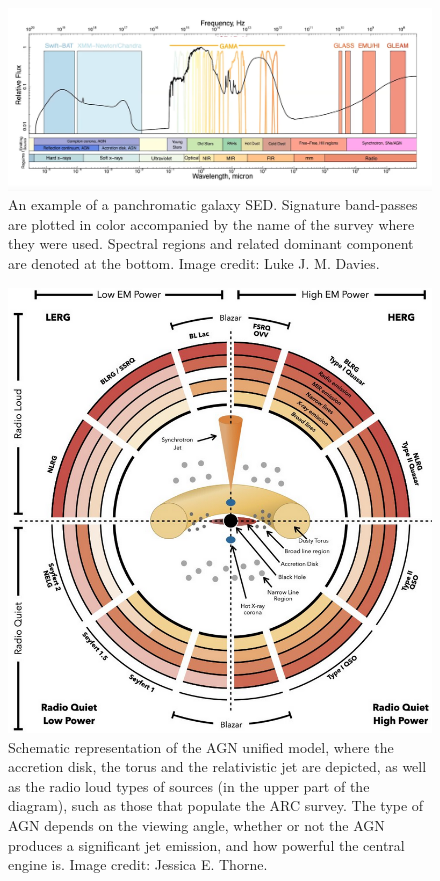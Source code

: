 \begin{figure}
  \includegraphics[width =\textwidth]{figures/SEDgeneral.png}
  \caption{An example of a panchromatic galaxy SED. Signature band-passes are plotted in color accompanied by the name of the survey where they were used. Spectral regions and related dominant component are denoted at the bottom. Image credit: Luke J. M. Davies. }
  \label{fig:SEDgeneral}
\end{figure}


\begin{figure}
  \includegraphics[width = \textwidth]{figures/UnificationThorne.png}
  \caption{Schematic representation of the AGN unified model, where the accretion disk, the torus and the relativistic jet are depicted, as well as the radio loud types of sources (in the upper part of the diagram), such as those that populate the ARC survey. The type of AGN depends on the viewing angle, whether or not the AGN produces a significant jet emission, and how powerful the central engine is. Image credit: Jessica E. Thorne. }
  \label{fig:AGNUni}
\end{figure}



